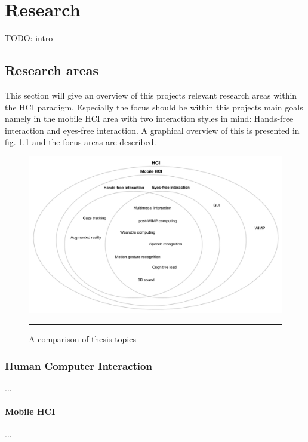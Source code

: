 \chapter{Research}
TODO: intro


\section{Research areas}
This section will give an overview of this projects relevant research areas within the HCI paradigm. Especially the focus should be within this projects main goals namely in the mobile HCI area with two interaction styles in mind: Hands-free interaction and eyes-free interaction. A graphical overview of this is presented in fig. \ref{fig:venn} and the focus areas are described.

\begin{figure}[htbp]
	\centering
		\includegraphics[width=\textwidth,height=\textheight,keepaspectratio]{./Figures/venn-diagram.pdf}
		\rule{35em}{0.5pt}
	\caption[Venn diagram]{A comparison of thesis topics}
	\label{fig:venn}
\end{figure}

\subsection{Human Computer Interaction}
...

\subsubsection{Mobile HCI}
...

